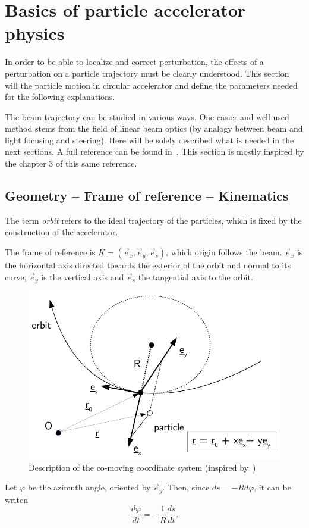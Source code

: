 
\chapter{Basics of particle accelerator physics}
\label{sec:acc_physics}
In order to be able to localize and correct perturbation, the effects of a perturbation on a particle trajectory must be clearly understood. This section will the particle motion in circular accelerator and define the parameters needed for the following explanations.

The beam trajectory can be studied in various ways. One easier and well used method stems from the field of linear beam optics (by analogy between beam and light focusing and steering). Here will be solely described what is needed in the next sections. A full reference can be found in~\cite{book:wille}. This section is mostly inspired by the chapter 3 of this same reference.

\section{Geometry -- Frame of reference -- Kinematics}
The term \emph{orbit} refers to the ideal trajectory of the particles, which is fixed by the construction of the accelerator.

The frame of reference is $K=(\vec{e}_x,\vec{e}_y, \vec{e}_s)$, which origin follows the beam. $\vec{e}_x$ is the horizontal axis directed towards the exterior of the orbit and normal to its curve, $\vec{e}_y$ is the vertical axis and $\vec{e}_s$ the tangential axis to the orbit.
\begin{figure}
    \centering
    \includegraphics[width=0.8\linewidth]{img/orbit_coordinates.pdf}
    \caption[Description of the co-moving coordinate system]{\label{fig:coordinate system}Description of the co-moving coordinate system (inspired by~\cite{book:wille})}
\end{figure}
Let $\varphi$ be the azimuth angle, oriented by $\vec{e}_y$. Then, since $ds = -R d\varphi$, it can be writen
\begin{equation}
\frac{d \varphi}{d t}  = -\frac{1}{R} \frac{d s}{d t}.
\end{equation}

